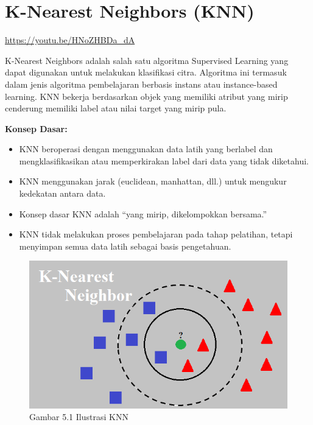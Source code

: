 \documentclass[
  letterpaper,
  DIV=11,
  numbers=noendperiod]{scrreprt}
\providecommand{\tightlist}{%
  \setlength{\itemsep}{0pt}\setlength{\parskip}{0pt}}\usepackage{longtable,booktabs,array}
\begin{document}
\hypertarget{k-nearest-neighbors-knn}{%
\section*{K-Nearest Neighbors (KNN)}\label{k-nearest-neighbors-knn}}


\url{https://youtu.be/HNoZHBDa_dA}

K-Nearest Neighbors adalah salah satu algoritma Supervised Learning yang
dapat digunakan untuk melakukan klasifikasi citra. Algoritma ini
termasuk dalam jenis algoritma pembelajaran berbasis instans atau
instance-based learning. KNN bekerja berdasarkan objek yang memiliki
atribut yang mirip cenderung memiliki label atau nilai target yang mirip
pula.

\textbf{Konsep Dasar:}

\begin{itemize}
\tightlist
\item
  KNN beroperasi dengan menggunakan data latih yang berlabel dan
  mengklasifikasikan atau memperkirakan label dari data yang tidak
  diketahui.\\
\item
  KNN menggunakan jarak (euclidean, manhattan, dll.) untuk mengukur
  kedekatan antara data.\\
\item
  Konsep dasar KNN adalah ``yang mirip, dikelompokkan bersama.''\\
\item
  KNN tidak melakukan proses pembelajaran pada tahap pelatihan, tetapi
  menyimpan semua data latih sebagai basis pengetahuan.
\end{itemize}

\begin{figure}

{\centering \includegraphics{Asset/knnilustration.png}

}

\caption{Gambar 5.1 Ilustrasi KNN}

\end{figure}
\end{document}
